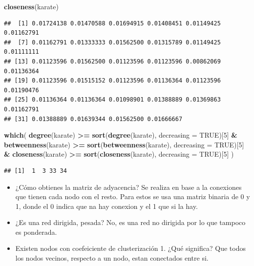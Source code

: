\documentclass[
]{article}
\newenvironment{Shaded}{\begin{snugshade}}{\end{snugshade}}
\newcommand{\AttributeTok}[1]{\textcolor[rgb]{0.13,0.29,0.53}{#1}}
\newcommand{\ConstantTok}[1]{\textcolor[rgb]{0.56,0.35,0.01}{#1}}
\newcommand{\DecValTok}[1]{\textcolor[rgb]{0.00,0.00,0.81}{#1}}
\newcommand{\FunctionTok}[1]{\textcolor[rgb]{0.13,0.29,0.53}{\textbf{#1}}}
\newcommand{\NormalTok}[1]{#1}
\newcommand{\SpecialCharTok}[1]{\textcolor[rgb]{0.81,0.36,0.00}{\textbf{#1}}}
\begin{document}
\begin{Shaded}
\begin{Highlighting}[]
\FunctionTok{closeness}\NormalTok{(karate)}
\end{Highlighting}
\end{Shaded}

\begin{verbatim}
##  [1] 0.01724138 0.01470588 0.01694915 0.01408451 0.01149425 0.01162791
##  [7] 0.01162791 0.01333333 0.01562500 0.01315789 0.01149425 0.01111111
## [13] 0.01123596 0.01562500 0.01123596 0.01123596 0.00862069 0.01136364
## [19] 0.01123596 0.01515152 0.01123596 0.01136364 0.01123596 0.01190476
## [25] 0.01136364 0.01136364 0.01098901 0.01388889 0.01369863 0.01162791
## [31] 0.01388889 0.01639344 0.01562500 0.01666667
\end{verbatim}

\begin{Shaded}
\begin{Highlighting}[]
\FunctionTok{which}\NormalTok{(}
  \FunctionTok{degree}\NormalTok{(karate) }\SpecialCharTok{\textgreater{}=} \FunctionTok{sort}\NormalTok{(}\FunctionTok{degree}\NormalTok{(karate), }\AttributeTok{decreasing =} \ConstantTok{TRUE}\NormalTok{)[}\DecValTok{5}\NormalTok{] }\SpecialCharTok{\&} 
    \FunctionTok{betweenness}\NormalTok{(karate) }\SpecialCharTok{\textgreater{}=} \FunctionTok{sort}\NormalTok{(}\FunctionTok{betweenness}\NormalTok{(karate), }\AttributeTok{decreasing =} \ConstantTok{TRUE}\NormalTok{)[}\DecValTok{5}\NormalTok{] }\SpecialCharTok{\&} 
    \FunctionTok{closeness}\NormalTok{(karate) }\SpecialCharTok{\textgreater{}=} \FunctionTok{sort}\NormalTok{(}\FunctionTok{closeness}\NormalTok{(karate), }\AttributeTok{decreasing =} \ConstantTok{TRUE}\NormalTok{)[}\DecValTok{5}\NormalTok{]}
\NormalTok{)}
\end{Highlighting}
\end{Shaded}

\begin{verbatim}
## [1]  1  3 33 34
\end{verbatim}

\begin{itemize}
\item
  ¿Cómo obtienes la matriz de adyacencia? Se realiza en base a la
  conexiones que tienen cada nodo con el resto. Para estos se usa una
  matriz binaria de 0 y 1, donde el 0 indica que na hay conexion y el 1
  que si la hay.
\item
  ¿Es una red dirigida, pesada? No, es una red no dirigida por lo que
  tampoco es ponderada.
\item
  Existen nodos con coefeiciente de clusterización 1. ¿Qué significa?
  Que todos los nodos vecinos, respecto a un nodo, estan conectados
  entre si.
\end{itemize}
\end{document}

